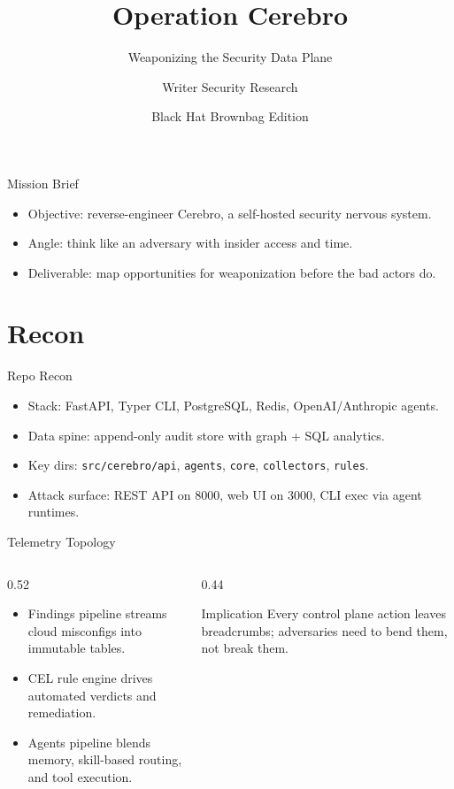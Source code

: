 \documentclass[aspectratio=169]{beamer}
\title{Operation Cerebro}
\subtitle{Weaponizing the Security Data Plane}
\author{Writer Security Research}
\date{Black Hat Brownbag Edition}
\begin{document}
\begin{frame}
  \titlepage
\end{frame}

\begin{frame}{Mission Brief}
  \begin{itemize}
    \item Objective: reverse-engineer Cerebro, a self-hosted security nervous system.
    \item Angle: think like an adversary with insider access and time.
    \item Deliverable: map opportunities for weaponization before the bad actors do.
  \end{itemize}
\end{frame}

\section{Recon}

\begin{frame}{Repo Recon}
  \begin{itemize}
    \item Stack: FastAPI, Typer CLI, PostgreSQL, Redis, OpenAI/Anthropic agents.
    \item Data spine: append-only audit store with graph + SQL analytics.
    \item Key dirs: \texttt{src/cerebro/api}, \texttt{agents}, \texttt{core}, \texttt{collectors}, \texttt{rules}.
    \item Attack surface: REST API on 8000, web UI on 3000, CLI exec via agent runtimes.
  \end{itemize}
\end{frame}

\begin{frame}{Telemetry Topology}
  \begin{columns}
    \begin{column}{0.52\textwidth}
      \begin{itemize}
        \item Findings pipeline streams cloud misconfigs into immutable tables.
        \item CEL rule engine drives automated verdicts and remediation.
        \item Agents pipeline blends memory, skill-based routing, and tool execution.
      \end{itemize}
    \end{column}
    \begin{column}{0.44\textwidth}
      \begin{block}{Implication}
        Every control plane action leaves breadcrumbs; adversaries need to bend them, not break them.
      \end{block}
    \end{column}
  \end{columns}
\end{frame}
\end{document}
